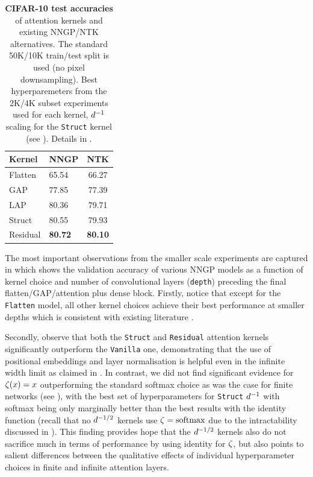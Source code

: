\documentclass{article}
\begin{document}
\begin{table}[tbp]
\caption{\textbf{CIFAR-10 test accuracies} of attention kernels and existing NNGP/NTK alternatives.
The standard 50K/10K train/test split is used (no pixel downsampling).
Best hyperparemeters from the 2K/4K subset experiments used for each kernel, $d^{-1}$ scaling for the \texttt{Struct} kernel (see ). Details in .}
\label{tab:full_data_results}
\vskip 0.15in
\begin{center}
\begin{small}
\begin{sc}
\noindent
\begin{tabularx}{\columnwidth}{X l c}
    \toprule
    Kernel & NNGP & NTK \\
    \midrule
    Flatten    &  65.54  & 66.27 \\
    GAP \cite{li2019enhanced} & 77.85  & 77.39 \\
    LAP \cite{li2019enhanced} & 80.36 & 79.71 \\
    Struct & 80.55  & 79.93 \\
    Residual & \textbf{80.72}  &  \textbf{80.10} \\
    \bottomrule
\end{tabularx}
%
\end{sc}
\end{small}
\end{center}
\vskip -0.18in
\end{table}



The most important observations from the smaller scale experiments are captured in  which shows the validation accuracy of various NNGP models as a function of kernel choice and number of convolutional layers (\texttt{depth}) preceding the final flatten/GAP/attention plus dense block.
Firstly, notice that except for the \texttt{Flatten} model, all other kernel choices achieve their best performance at smaller depths which is consistent with existing literature \citep{arora2019,li2019enhanced}.

Secondly, observe that both the \texttt{Struct} and \texttt{Residual} attention kernels significantly outperform the \texttt{Vanilla} one, demonstrating that the use of positional embeddings and layer normalisation is helpful even in the infinite width limit as claimed in .
In contrast, we did not find significant evidence for $\zeta(x) = x$ outperforming the standard softmax choice as was the case for finite networks (see ), with the best set of hyperparameters for \texttt{Struct} $d^{-1}$ with softmax being only marginally better than the best results with the identity function (recall that no $d^{-1/2}$ kernels use $\zeta = \text{softmax}$ due to the intractability discussed in ).
This finding provides hope that the $d^{-1/2}$ kernels also do not sacrifice much in terms of performance by using identity for $\zeta$, but also points to salient differences between the qualitative effects of individual hyperparameter choices in finite and infinite attention layers.
\end{document}
